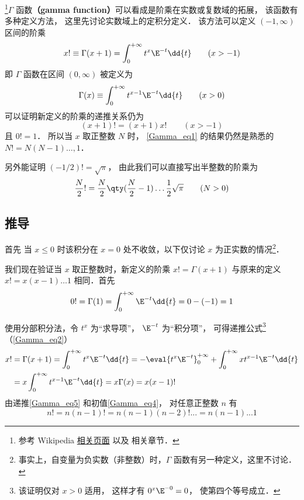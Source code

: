 

\footnote{参考 Wikipedia \href{https://en.wikipedia.org/wiki/Gamma_function}{相关页面} 以及 \cite{Arfken} 相关章节．}$\Gamma$ 函数\textbf{（gamma function）}可以看成是阶乘在实数或复数域的拓展， 该函数有多种定义方法， 这里先讨论实数域上的定积分定义． 该方法可以定义 $(-1, \infty)$ 区间的阶乘
\begin{equation}\label{Gamma_eq1}
x! \equiv \Gamma (x + 1) = \int_0^{+\infty} t^x \E^{-t} \dd{t} \qquad (x > -1)
\end{equation}
即 $\Gamma$ 函数在区间 $(0,\infty)$ 被定义为
\begin{equation}\label{Gamma_eq3}
\Gamma(x) \equiv \int_0^{+\infty} t^{x-1} \E^{-t} \dd{t} \qquad (x > 0)
\end{equation}
可以证明新定义的阶乘的递推关系仍为
\begin{equation}\label{Gamma_eq2}
(x+1)!=(x+1)x! \qquad (x>-1)
\end{equation}
且 $0! = 1$． 所以当 $x$ 取正整数 $N$ 时， \autoref{Gamma_eq1} 的结果仍然是熟悉的 $N! = N(N-1)\dots, 1$．

另外能证明 $(-1/2)!=\sqrt{\pi}$， 由此我们可以直接写出半整数的阶乘为
\begin{equation}
\frac{N}{2}! = \frac{N}{2} \qty(\frac{N}{2}-1) \dots \frac12 \sqrt{\pi} \qquad (N > 0)
\end{equation}

\subsection{推导}

首先
当 $x \leqslant 0$ 时该积分在 $x=0$ 处不收敛，以下仅讨论 $x$ 为正实数的情况\footnote{事实上，自变量为负实数（非整数）时，$\Gamma$ 函数有另一种定义，这里不讨论．}．

我们现在验证当 $x$ 取正整数时，新定义的阶乘 $x! = \Gamma(x+1)$ 与原来的定义 $x! = x(x-1)\dots 1$ 相同．首先
\begin{equation}\label{Gamma_eq4}
0! = \Gamma(1) = \int_0^{+\infty} \E^{-t} \dd{t} = 0 - (-1) = 1
\end{equation}

使用分部积分法，令 $t^x$ 为“求导项”， $\E^{-t}$ 为“积分项”， 可得递推公式\footnote{该证明仅对 $x>0$ 适用， 这样才有 $0^x \E^{-0} = 0$， 使第四个等号成立．}（\autoref{Gamma_eq2}）
\begin{equation}\label{Gamma_eq5}
\begin{aligned}
x! &= \Gamma(x+1) = \int_0^{+\infty} t^x \E^{-t} \dd{t} =  - \eval{t^x \E^{-t}}_{0}^{+\infty} + \int_0^{+\infty} x t^{x-1} \E^{-t} \dd{t} \\
&= x\int_0^{+\infty} t^{x-1} \E^{-t} \dd{t} = x\Gamma (x) = x(x-1)!
\end{aligned} \end{equation} 
由递推\autoref{Gamma_eq5} 和初值\autoref{Gamma_eq4}， 对任意正整数 $n$ 有
\begin{equation}
n! = n(n-1)! = n(n-1)(n-2)!... = n(n-1)...1
\end{equation}

